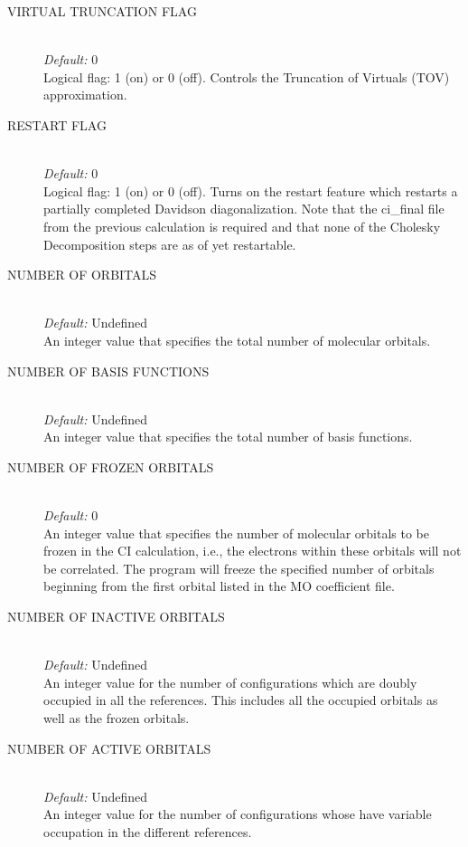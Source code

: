 \documentclass{article}
\begin{document}
\begin{description}

	\item[VIRTUAL TRUNCATION FLAG] \hfill \\
	\emph{Default:} 0 \hfill \\
	Logical flag: 1 (on) or 0 (off). Controls the Truncation of Virtuals (TOV) approximation.
	
	\item[RESTART FLAG] \hfill \\
	\emph{Default:} 0 \hfill \\
	Logical flag: 1 (on) or 0 (off). Turns on the restart feature which restarts a partially completed Davidson diagonalization. Note that the ci\_final file from the previous calculation is required and that none of the Cholesky Decomposition steps are as of yet restartable.

	\item[NUMBER OF ORBITALS] \hfill \\
	\emph{Default:} Undefined \hfill \\
	An integer value that specifies the total number of molecular orbitals. 
	
	\item[NUMBER OF BASIS FUNCTIONS ] \hfill \\
	\emph{Default:} Undefined \hfill \\
	An integer value that specifies the total number of basis functions. 
	
	\item[NUMBER OF FROZEN ORBITALS ] \hfill \\
	\emph{Default:} 0 \hfill \\
An integer value that specifies the number of molecular orbitals to be frozen in the CI calculation, i.e., the electrons within these orbitals will not be correlated. The program will freeze the specified number of orbitals beginning from the first orbital listed in the MO coefficient file. 

	\item[NUMBER OF INACTIVE ORBITALS ] \hfill \\
	\emph{Default:} Undefined \hfill \\
        An integer value for the number of configurations which are doubly occupied in all the references. This includes all the occupied orbitals as well as the frozen orbitals. 
        
        \item[NUMBER OF ACTIVE ORBITALS ] \hfill \\
        \emph{Default:} Undefined \hfill \\
        An integer value for the number of configurations whose have variable occupation in the different references.  
        

\end{description}
\end{document}
